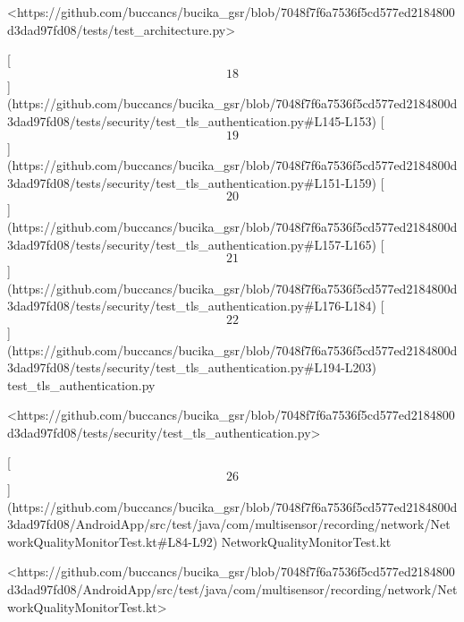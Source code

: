\documentclass[12pt,a4paper]{article}
\begin{document}
{<https://github.com/buccancs/bucika_gsr/blob/7048f7f6a7536f5cd577ed2184800d3dad97fd08/tests/test_architecture.py>

[\[18\]](https://github.com/buccancs/bucika_gsr/blob/7048f7f6a7536f5cd577ed2184800d3dad97fd08/tests/security/test_tls_authentication.py#L145-L153)
[\[19\]](https://github.com/buccancs/bucika_gsr/blob/7048f7f6a7536f5cd577ed2184800d3dad97fd08/tests/security/test_tls_authentication.py#L151-L159)
[\[20\]](https://github.com/buccancs/bucika_gsr/blob/7048f7f6a7536f5cd577ed2184800d3dad97fd08/tests/security/test_tls_authentication.py#L157-L165)
[\[21\]](https://github.com/buccancs/bucika_gsr/blob/7048f7f6a7536f5cd577ed2184800d3dad97fd08/tests/security/test_tls_authentication.py#L176-L184)
[\[22\]](https://github.com/buccancs/bucika_gsr/blob/7048f7f6a7536f5cd577ed2184800d3dad97fd08/tests/security/test_tls_authentication.py#L194-L203)
test_tls_authentication.py

<https://github.com/buccancs/bucika_gsr/blob/7048f7f6a7536f5cd577ed2184800d3dad97fd08/tests/security/test_tls_authentication.py>

[\[26\]](https://github.com/buccancs/bucika_gsr/blob/7048f7f6a7536f5cd577ed2184800d3dad97fd08/AndroidApp/src/test/java/com/multisensor/recording/network/NetworkQualityMonitorTest.kt#L84-L92)
NetworkQualityMonitorTest.kt

<https://github.com/buccancs/bucika_gsr/blob/7048f7f6a7536f5cd577ed2184800d3dad97fd08/AndroidApp/src/test/java/com/multisensor/recording/network/NetworkQualityMonitorTest.kt>

}
\end{document}
